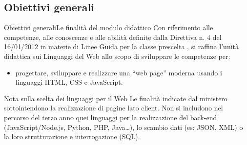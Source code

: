 \documentclass[italian]{beamer}
\begin{document}
\subsection[Finalit\`a]{Obiettivi generali}
\begin{frame}{Obiettivi generali}{Le finalit\`a del modulo didattico}
	Con riferimento alle competenze, alle conoscenze e alle abilit\`a definite dalla Direttiva n. 4 del 16/01/2012 in materie di Linee Guida per la classe prescelta \hyperlink{dir:16012012}{}, si raffina l'unit\`a didattica sui Linguaggi del Web allo scopo di sviluppare le competenze per:
	
	\begin{itemize}
		\item \alert{progettare, sviluppare e realizzare una ``web page'' moderna
		usando i linguaggi HTML, CSS e JavaScript.}
	\end{itemize}
	
	\begin{exampleblock}{Nota sulla scelta dei linguaggi per il Web}
		Le finalit\`a indicate dal ministero sottointendono la realizzazione di pagine lato client. Non si includono nel percorso del terzo anno quei linguaggi per la realizzazione del back-end (JavaScript/Node.js, Python, PHP, Java\ldots{}), lo scambio dati (es: JSON, XML) o la loro strutturazione e interrogazione (SQL).
	\end{exampleblock}
	\note{%
		
	}%
\end{frame}
\end{document}
